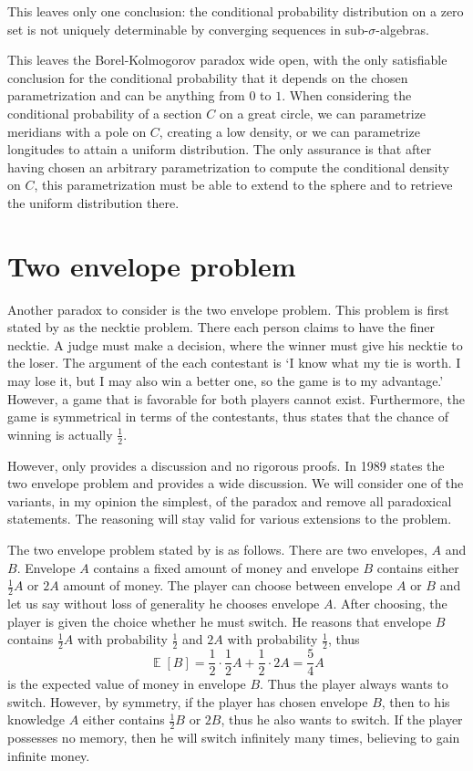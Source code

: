 \documentclass[twoside,a4paper]{article}
\theoremstyle{plain}
\theoremstyle{definition}
\theoremstyle{remark}
\numberwithin{equation}{section}
\DeclareMathOperator{\E}{\mathbb{E}}
\DeclareMathOperator{\1}{\mathbbm{1}}
\begin{document}
This leaves only one conclusion: the conditional probability distribution on a zero set is not uniquely determinable by converging sequences in sub-$\sigma$-algebras.

This leaves the Borel-Kolmogorov paradox wide open, with the only satisfiable conclusion for the conditional probability that it depends on the chosen parametrization and can be anything from $0$ to $1$. When considering the conditional probability of a section $C$ on a great circle, we can parametrize meridians with a pole on $C$, creating a low density, or we can parametrize longitudes to attain a uniform distribution. The only assurance is that after having chosen an arbitrary parametrization to compute the conditional density on $C$, this parametrization must be able to extend to the sphere and to retrieve the uniform distribution there.
\section{Two envelope problem}
Another paradox to consider is the two envelope problem. This problem is first stated by \cite{Kraitchik53} as the necktie problem. There each person claims to have the finer necktie. A judge must make a decision, where the winner must give his necktie to the loser. The argument of the each contestant is `I know what my tie is worth. I may lose it, but I may also win a better one, so the game is to my advantage.' However, a game that is favorable for both players cannot exist. Furthermore, the game is symmetrical in terms of the contestants, thus \cite{Kraitchik53} states that the chance of winning is actually $\frac{1}{2}$.

However, \cite{Kraitchik53} only provides a discussion and no rigorous proofs. In 1989 \cite{Nalebuff89} states the two envelope problem and provides a wide discussion. We will consider one of the variants, in my opinion the simplest, of the paradox and remove all paradoxical statements. The reasoning will stay valid for various extensions to the problem.

The two envelope problem stated by \cite{Nalebuff89} is as follows. There are two envelopes, $A$ and $B$. Envelope $A$ contains a fixed amount of money and envelope $B$ contains either $\frac{1}{2}A$ or $2A$ amount of money. The player can choose between envelope $A$ or $B$ and let us say without loss of generality he chooses envelope $A$. After choosing, the player is given the choice whether he must switch. He reasons that envelope $B$ contains $\frac{1}{2}A$ with probability $\frac{1}{2}$ and $2A$ with probability $\frac{1}{2}$, thus \[\E[B]=\frac{1}{2}\cdot\frac{1}{2}A+\frac{1}{2}\cdot2A=\frac{5}{4}A\] is the expected value of money in envelope $B$. Thus the player always wants to switch. However, by symmetry, if the player has chosen envelope $B$, then to his knowledge $A$ either contains $\frac{1}{2}B$ or $2B$, thus he also wants to switch. If the player possesses no memory, then he will switch infinitely many times, believing to gain infinite money.
\end{document}

